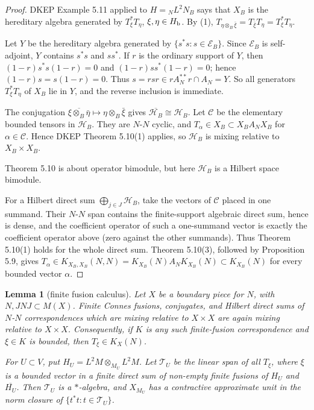 \documentclass[12pt]{article}
\newtheorem{lemma}{Lemma}
\newcommand{\cT}{\mathcal T}
\newcommand{\cH}{\mathcal H}
\newcommand{\review}[1]{\begin{reviewbox}#1\end{reviewbox}}
\begin{document}
\begin{proof}
DKEP Example 5.11 applied to \(H={}_NL^2N_B\) says that \(X_B\) is the
hereditary algebra generated by \(T_\xi^*T_\eta\), \(\xi,\eta\in H_{\rm b}\).
By (1), \(T_{\eta\otimes_B\bar\xi}=T_{\bar\xi}T_\eta=T_\xi^*T_\eta\).

Let \(Y\) be the hereditary algebra generated by \(\{s^*s:s\in\mathcal E_B\}\).
Since \(\mathcal E_B\) is self-adjoint, \(Y\) contains \(s^*s\) and \(ss^*\).
If \(r\) is the ordinary support of \(Y\), then
\((1-r)s^*s(1-r)=0\) and \((1-r)ss^*(1-r)=0\); hence \((1-r)s=s(1-r)=0\).
Thus \(s=rsr\in rA_N^{**}r\cap A_N=Y\).  So all generators
\(T_\xi^*T_\eta\) of \(X_B\) lie in \(Y\), and the reverse inclusion is
immediate.

The conjugation \(\overline{\xi\otimes_B\bar\eta}\mapsto
\eta\otimes_B\bar\xi\) gives \(\overline{\cH_B}\cong\cH_B\).  Let
\(\mathcal C\) be the elementary bounded tensors in \(\cH_B\).  They are
\(N\)-\(N\) cyclic, and \(T_\alpha\in X_B\subset X_BA_NX_B\) for
\(\alpha\in\mathcal C\).  Hence DKEP Theorem 5.10(1) applies, so \(\cH_B\) is
mixing relative to \(X_B\times X_B\). 
\review{Theorem 5.10 is about operator bimodule, but here $\mathcal{H}_B$ is a Hilbert space bimodule.}

For a Hilbert direct sum
\(\bigoplus_{j\in J}\cH_B\), take the vectors of \(\mathcal C\) placed in one
summand.  Their \(N\)-\(N\) span contains the finite-support algebraic direct
sum, hence is dense, and the coefficient operator of such a one-summand vector
is exactly the coefficient operator above (zero against the other summands).
Thus Theorem 5.10(1) holds for the whole direct sum.  Theorem 5.10(3), followed
by Proposition 5.9, gives \(T_\alpha\in K_{X_B,X_B}(N,N)=K_{X_B}(N)A_N
K_{X_B}(N)\subset K_{X_B}(N)\) for every bounded vector \(\alpha\).
\end{proof}

\begin{lemma}[finite fusion calculus]\label{lem:fusion}
Let \(X\) be a boundary piece for \(N\), with \(N,JNJ\subset M(X)\).  Finite
Connes fusions, conjugates, and Hilbert direct sums of \(N\)-\(N\)
correspondences which are mixing relative to \(X\times X\) are again mixing
relative to \(X\times X\).  Consequently, if \(K\) is any such finite-fusion
correspondence and \(\xi\in K\) is bounded, then \(T_\xi\in K_X(N)\).

For \(U\subset V\), put \(H_U=L^2M\otimes_{M_U}L^2M\).  Let \(\cT_U\) be the
linear span of all \(T_\xi\), where \(\xi\) is a bounded vector in a finite
direct sum of non-empty finite fusions of \(H_U\) and \(\overline{H_U}\).
Then \(\cT_U\) is a \(*\)-algebra, and \(X_{M_U}\) has a contractive
approximate unit in the norm closure of \(\{t^*t:t\in\cT_U\}\).
\end{lemma}
\end{document}
